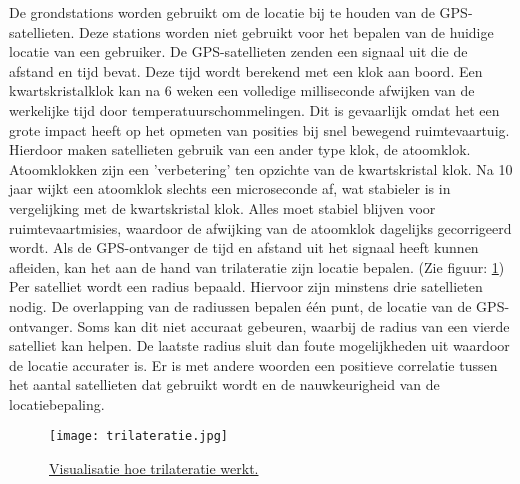 De grondstations worden gebruikt om de locatie bij te houden van de GPS-satellieten. Deze stations worden niet gebruikt voor het bepalen van de huidige locatie van een gebruiker. 
\newline
\newline
De GPS-satellieten zenden een signaal uit die de afstand en tijd bevat. Deze tijd wordt berekend met een klok aan boord. Een kwartskristalklok kan na 6 weken een volledige milliseconde afwijken van de werkelijke tijd door temperatuurschommelingen. Dit is gevaarlijk omdat het een grote impact heeft op het opmeten van posities bij snel bewegend ruimtevaartuig. Hierdoor maken satellieten gebruik van een ander type klok, de atoomklok. Atoomklokken zijn een 'verbetering' ten opzichte van de kwartskristal klok.  Na 10 jaar wijkt een atoomklok slechts een microseconde af, wat stabieler is in vergelijking met de kwartskristal klok. Alles moet stabiel blijven voor ruimtevaartmisies, waardoor de afwijking van de atoomklok dagelijks gecorrigeerd wordt. \autocite{atomic_clock}
\newline
Als de GPS-ontvanger de tijd en afstand uit het signaal heeft kunnen afleiden, kan het aan de hand van trilateratie zijn locatie bepalen. (Zie figuur: \ref{fig:trilateratie})
Per satelliet wordt een radius bepaald. Hiervoor zijn minstens drie satellieten nodig. De overlapping van de radiussen bepalen één punt, de locatie van de GPS-ontvanger. Soms kan dit niet accuraat gebeuren, waarbij de radius van een vierde satelliet kan helpen. De laatste radius sluit dan foute mogelijkheden uit waardoor de locatie accurater is. Er is met andere woorden een positieve correlatie tussen het aantal satellieten dat gebruikt wordt en de nauwkeurigheid van de locatiebepaling. \autocite{gps}

\begin{figure}
	\texttt{[image: trilateratie.jpg]}
	\caption[Werking trilateratie]{\href{https://gisgeography.com/trilateration-triangulation-gps/}{Visualisatie hoe trilateratie werkt. \autocite{img_trilateratie}}}
	\label{fig:trilateratie}
\end{figure} 
\pagebreak

